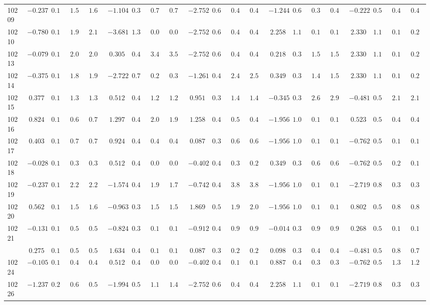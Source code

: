\documentclass[6pt]{article}
\begin{document}
\begin{landscape}
{\begin{longtable}{lrrrrrrrrrrrrrrrrrrrr}
10209&$-0.237$&$0.165$&$1.597$&$1.644$&$-1.104$&$0.391$&$0.743$&$0.727$&$-2.752$&$0.671$&$0.419$&$0.418$&$-1.244$&$0.630$&$0.397$&$0.401$&$-0.222$&$0.517$&$0.435$&$0.409$\tabularnewline
10210&$-0.780$&$0.188$&$1.937$&$2.140$&$-3.681$&$1.306$&$0.087$&$0.095$&$-2.752$&$0.671$&$0.419$&$0.418$&$ 2.258$&$1.137$&$0.144$&$0.139$&$ 2.330$&$1.198$&$0.174$&$0.222$\tabularnewline
10213&$-0.079$&$0.161$&$2.095$&$2.075$&$ 0.305$&$0.437$&$3.401$&$3.535$&$-2.752$&$0.671$&$0.419$&$0.418$&$ 0.218$&$0.370$&$1.597$&$1.525$&$ 2.330$&$1.198$&$0.174$&$0.222$\tabularnewline
10214&$-0.375$&$0.169$&$1.851$&$1.920$&$-2.722$&$0.762$&$0.275$&$0.329$&$-1.261$&$0.432$&$2.481$&$2.574$&$ 0.349$&$0.386$&$1.469$&$1.526$&$ 2.330$&$1.198$&$0.174$&$0.222$\tabularnewline
10215&$ 0.377$&$0.161$&$1.305$&$1.319$&$ 0.512$&$0.443$&$1.219$&$1.216$&$ 0.951$&$0.394$&$1.433$&$1.442$&$-0.345$&$0.363$&$2.636$&$2.908$&$-0.481$&$0.528$&$2.122$&$2.112$\tabularnewline
10216&$ 0.824$&$0.180$&$0.669$&$0.717$&$ 1.297$&$0.422$&$2.059$&$1.974$&$ 1.258$&$0.420$&$0.508$&$0.499$&$-1.956$&$1.082$&$0.145$&$0.149$&$ 0.523$&$0.538$&$0.455$&$0.438$\tabularnewline
10217&$ 0.403$&$0.162$&$0.749$&$0.729$&$ 0.924$&$0.438$&$0.483$&$0.470$&$ 0.087$&$0.394$&$0.677$&$0.699$&$-1.956$&$1.082$&$0.145$&$0.149$&$-0.762$&$0.547$&$0.128$&$0.127$\tabularnewline
10218&$-0.028$&$0.161$&$0.361$&$0.358$&$ 0.512$&$0.443$&$0.056$&$0.057$&$-0.402$&$0.408$&$0.301$&$0.299$&$ 0.349$&$0.386$&$0.621$&$0.685$&$-0.762$&$0.547$&$0.205$&$0.198$\tabularnewline
10219&$-0.237$&$0.165$&$2.223$&$2.282$&$-1.574$&$0.438$&$1.936$&$1.702$&$-0.742$&$0.415$&$3.805$&$3.809$&$-1.956$&$1.082$&$0.145$&$0.149$&$-2.719$&$0.854$&$0.301$&$0.304$\tabularnewline
10220&$ 0.562$&$0.166$&$1.539$&$1.641$&$-0.963$&$0.386$&$1.536$&$1.549$&$ 1.869$&$0.531$&$1.941$&$2.034$&$-1.956$&$1.082$&$0.145$&$0.149$&$ 0.802$&$0.573$&$0.820$&$0.881$\tabularnewline
10221&$-0.131$&$0.162$&$0.539$&$0.554$&$-0.824$&$0.383$&$0.100$&$0.100$&$-0.912$&$0.418$&$0.933$&$0.923$&$-0.014$&$0.353$&$0.960$&$0.970$&$ 0.268$&$0.520$&$0.127$&$0.131$\tabularnewline
\newpage
10223&$ 0.275$&$0.160$&$0.574$&$0.546$&$ 1.634$&$0.410$&$0.165$&$0.162$&$ 0.087$&$0.394$&$0.204$&$0.204$&$ 0.098$&$0.359$&$0.463$&$0.438$&$-0.481$&$0.528$&$0.829$&$0.774$\tabularnewline
10224&$-0.105$&$0.162$&$0.456$&$0.456$&$ 0.512$&$0.443$&$0.056$&$0.057$&$-0.402$&$0.408$&$0.176$&$0.177$&$ 0.887$&$0.493$&$0.363$&$0.325$&$-0.762$&$0.547$&$1.357$&$1.257$\tabularnewline
10226&$-1.237$&$0.228$&$0.625$&$0.561$&$-1.994$&$0.519$&$1.113$&$1.469$&$-2.752$&$0.671$&$0.419$&$0.418$&$ 2.258$&$1.137$&$0.144$&$0.139$&$-2.719$&$0.854$&$0.301$&$0.304$\tabularnewline

\end{longtable}}
\end{landscape}
\end{document}

